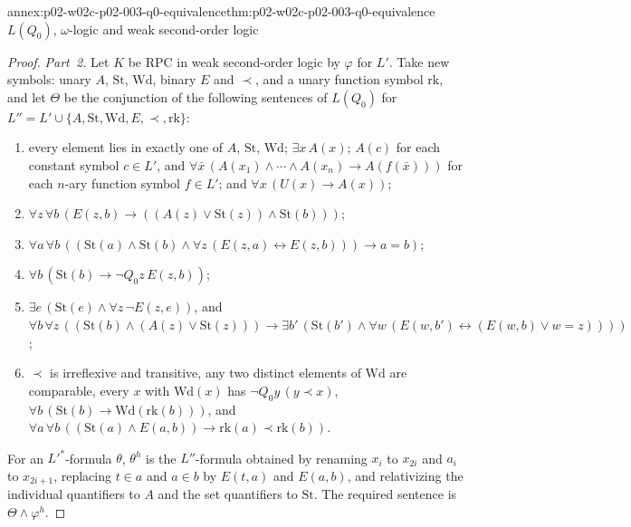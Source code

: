 \begin{annexitem}{annex:p02-w02c-p02-003-q0-equivalence}{thm:p02-w02c-p02-003-q0-equivalence}{\(L(Q_0)\), \(\omega\)-logic and weak second-order logic}
\begin{proof}
\emph{Part~2.}  Let \(K\) be RPC in weak second-order logic by \(\varphi\)
for \(L'\).  Take new symbols: unary \(A\), \(\mathrm{St}\), \(\mathrm{Wd}\),
binary \(E\) and \(\prec\), and a unary function symbol \(\mathrm{rk}\), and
let \(\Theta\) be the conjunction of the following sentences of \(L(Q_0)\)
for \(L''=L'\cup\{A,\mathrm{St},\mathrm{Wd},E,\prec,\mathrm{rk}\}\):
\begin{enumerate}
\item[(H1)] every element lies in exactly one of \(A\), \(\mathrm{St}\),
      \(\mathrm{Wd}\); \(\exists x\,A(x)\); \(A(c)\) for each constant
      symbol \(c\in L'\), and
      \(\forall\bar x\,(A(x_1)\land\cdots\land A(x_n)\to A(f(\bar x)))\) for
      each \(n\)-ary function symbol \(f\in L'\); and
      \(\forall x\,(U(x)\to A(x))\);
\item[(H2)] \(\forall z\,\forall b\,(E(z,b)\to((A(z)\lor\mathrm{St}(z))\land
      \mathrm{St}(b)))\);
\item[(H3)] \(\forall a\,\forall b\,((\mathrm{St}(a)\land\mathrm{St}(b)\land
      \forall z\,(E(z,a)\leftrightarrow E(z,b)))\to a=b)\);
\item[(H4)] \(\forall b\,(\mathrm{St}(b)\to\neg Q_0z\,E(z,b))\);
\item[(H5)] \(\exists e\,(\mathrm{St}(e)\land\forall z\,\neg E(z,e))\), and
      \(\forall b\,\forall z\,((\mathrm{St}(b)\land(A(z)\lor\mathrm{St}(z)))
      \to\exists b'\,(\mathrm{St}(b')\land\forall w\,(E(w,b')\leftrightarrow
      (E(w,b)\lor w=z))))\);
\item[(H6)] \(\prec\) is irreflexive and transitive, any two distinct
      elements of \(\mathrm{Wd}\) are comparable, every
      \(x\) with \(\mathrm{Wd}(x)\) has \(\neg Q_0y\,(y\prec x)\),
      \(\forall b\,(\mathrm{St}(b)\to\mathrm{Wd}(\mathrm{rk}(b)))\), and
      \(\forall a\,\forall b\,((\mathrm{St}(a)\land E(a,b))\to
      \mathrm{rk}(a)\prec\mathrm{rk}(b))\).
\end{enumerate}
For an \(L'^{*}\)-formula \(\theta\), \(\theta^{h}\) is the \(L''\)-formula
obtained by renaming \(x_i\) to \(x_{2i}\) and \(a_i\) to \(x_{2i+1}\),
replacing \(t\in a\) and \(a\in b\) by \(E(t,a)\) and \(E(a,b)\), and
relativizing the individual quantifiers to \(A\) and the set quantifiers to
\(\mathrm{St}\).  The required sentence is \(\Theta\land\varphi^{h}\).


\end{proof}
\end{annexitem}
